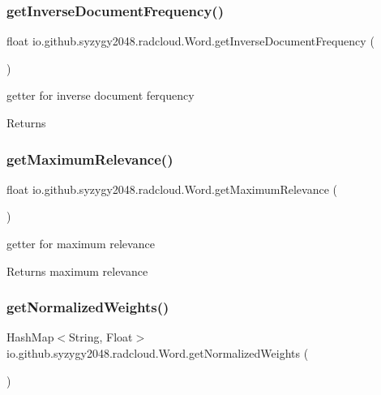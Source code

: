 \subsubsection{\texorpdfstring{get\+Inverse\+Document\+Frequency()}{getInverseDocumentFrequency()}}
{\footnotesize\ttfamily float io.\+github.\+syzygy2048.\+radcloud.\+Word.\+get\+Inverse\+Document\+Frequency (\begin{DoxyParamCaption}{ }\end{DoxyParamCaption})}

getter for inverse document ferquency \begin{DoxyReturn}{Returns}

\end{DoxyReturn}
\mbox{\label{classio_1_1github_1_1syzygy2048_1_1radcloud_1_1_word_a650b6f0273d5d3506f011c755ceb0c2b}} 
\subsubsection{\texorpdfstring{get\+Maximum\+Relevance()}{getMaximumRelevance()}}
{\footnotesize\ttfamily float io.\+github.\+syzygy2048.\+radcloud.\+Word.\+get\+Maximum\+Relevance (\begin{DoxyParamCaption}{ }\end{DoxyParamCaption})}

getter for maximum relevance \begin{DoxyReturn}{Returns}
maximum relevance 
\end{DoxyReturn}
\mbox{\label{classio_1_1github_1_1syzygy2048_1_1radcloud_1_1_word_aee98861b9717bf6e3a013b0d4d5bf3c4}} 
\subsubsection{\texorpdfstring{get\+Normalized\+Weights()}{getNormalizedWeights()}}
{\footnotesize\ttfamily Hash\+Map$<$String, Float$>$ io.\+github.\+syzygy2048.\+radcloud.\+Word.\+get\+Normalized\+Weights (\begin{DoxyParamCaption}{ }\end{DoxyParamCaption})}

